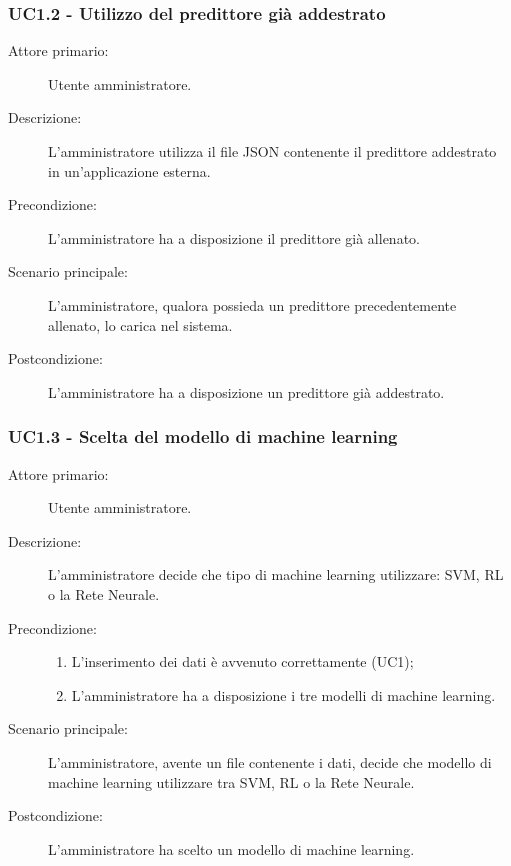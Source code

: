 \subsubsection{UC1.2 - Utilizzo del predittore già addestrato}
\label{sssec:uc1.2}
\begin{description}
  \item[Attore primario:] Utente amministratore.
  \item[Descrizione:] L'amministratore utilizza il file JSON contenente il predittore addestrato in un'applicazione esterna.
  \item[Precondizione:] L'amministratore ha a disposizione il predittore già allenato.
  \item[Scenario principale:] L'amministratore, qualora possieda un predittore precedentemente allenato, lo carica nel sistema.
  \item[Postcondizione:] L'amministratore ha a disposizione un predittore già addestrato.
\end{description}

\subsubsection{UC1.3 - Scelta del modello di machine learning}
\label{sssec:uc1.3}
\begin{description}
  \item[Attore primario:] Utente amministratore.
  \item[Descrizione:] L'amministratore decide che tipo di machine learning utilizzare: SVM, RL o la Rete Neurale.
  \item[Precondizione:]
  \begin{enumerate}
    \item L'inserimento dei dati è avvenuto correttamente (UC1);
    \item L'amministratore ha a disposizione i tre modelli di machine learning.
  \end{enumerate}
  \item[Scenario principale:] L'amministratore, avente un file contenente i dati, decide che modello di machine learning utilizzare tra SVM, RL o la Rete Neurale.
  \item[Postcondizione:] L'amministratore ha scelto un modello di machine learning.
\end{description}

